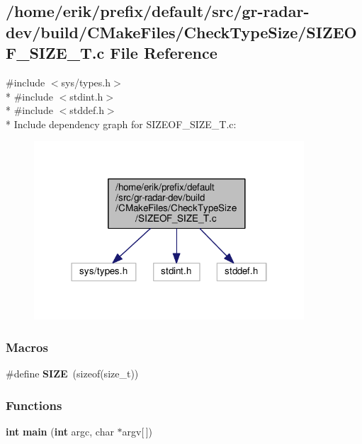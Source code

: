 \subsection{/home/erik/prefix/default/src/gr-\/radar-\/dev/build/\+C\+Make\+Files/\+Check\+Type\+Size/\+S\+I\+Z\+E\+O\+F\+\_\+\+S\+I\+Z\+E\+\_\+T.c File Reference}
\label{SIZEOF__SIZE__T_8c}
{\ttfamily \#include $<$sys/types.\+h$>$}\\*
{\ttfamily \#include $<$stdint.\+h$>$}\\*
{\ttfamily \#include $<$stddef.\+h$>$}\\*
Include dependency graph for S\+I\+Z\+E\+O\+F\+\_\+\+S\+I\+Z\+E\+\_\+\+T.\+c\+:
\nopagebreak
\begin{figure}[H]
\begin{center}
\leavevmode
\includegraphics[width=286pt]{d5/d64/SIZEOF__SIZE__T_8c__incl}
\end{center}
\end{figure}
\subsubsection*{Macros}
\begin{DoxyCompactItemize}
\item 
\#define {\bf S\+I\+ZE}~(sizeof(size\+\_\+t))
\end{DoxyCompactItemize}
\subsubsection*{Functions}
\begin{DoxyCompactItemize}
\item 
{\bf int} {\bf main} ({\bf int} argc, char $\ast$argv[$\,$])
\end{DoxyCompactItemize}
